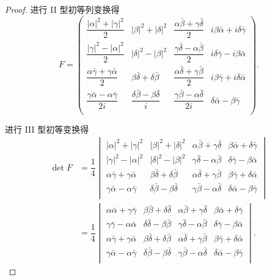 \documentclass[color=black,device=normal,lang=cn,mode=geye]{elegantnote}
\begin{document}
\begin{landscape}
\begin{proof}
        进行 II 型初等列变换得
        \[F=\begin{pmatrix}
            \dfrac{|\alpha|^2+|\gamma|^2}{2} & |\beta|^2+|\delta|^2 & \dfrac{\alpha\bar{\beta}+\gamma\bar{\delta}}{2} & i\beta\bar{\alpha}+i\delta\bar{\gamma} \\[8pt]
            \dfrac{|\gamma|^2-|\alpha|^2}{2} & |\delta|^2-|\beta|^2 & \dfrac{\gamma\bar{\delta}-\alpha\bar{\beta}}{2} & i\delta\bar{\gamma}-i\beta\bar{\alpha} \\[8pt]
            \dfrac{\alpha\bar{\gamma}+\gamma\bar{\alpha}}{2} & \beta\bar{\delta}+\delta\bar{\beta} & \dfrac{\alpha\bar{\delta}+\gamma\bar{\beta}}{2} & i\beta\bar{\gamma}+i\delta\bar{\alpha} \\[8pt]
            \dfrac{\gamma\bar{\alpha}-\alpha\bar{\gamma}}{2i} & \dfrac{\delta\bar{\beta}-\beta\bar{\delta}}{i} & \dfrac{\gamma\bar{\beta}-\alpha\bar{\delta}}{2i} & \delta\bar{\alpha}-\beta\bar{\gamma} \\[8pt]
        \end{pmatrix}.\]
    
        进行 III 型初等变换得
        \begin{align*}
            \det F & =\dfrac{1}{4}\begin{vmatrix}
                |\alpha|^2+|\gamma|^2 & |\beta|^2+|\delta|^2 & \alpha\bar{\beta}+\gamma\bar{\delta} & \beta\bar{\alpha}+\delta\bar{\gamma} \\
                |\gamma|^2-|\alpha|^2 & |\delta|^2-|\beta|^2 & \gamma\bar{\delta}-\alpha\bar{\beta} & \delta\bar{\gamma}-\beta\bar{\alpha} \\
                \alpha\bar{\gamma}+\gamma\bar{\alpha} & \beta\bar{\delta}+\delta\bar{\beta} & \alpha\bar{\delta}+\gamma\bar{\beta} & \beta\bar{\gamma}+\delta\bar{\alpha} \\
                \gamma\bar{\alpha}-\alpha\bar{\gamma} & \delta\bar{\beta}-\beta\bar{\delta} & \gamma\bar{\beta}-\alpha\bar{\delta} & \delta\bar{\alpha}-\beta\bar{\gamma} \\
            \end{vmatrix} \\
            & =\dfrac{1}{4}\begin{vmatrix}
                \alpha\bar{\alpha}+\gamma\bar{\gamma} & \beta\bar{\beta}+\delta\bar{\delta} & \alpha\bar{\beta}+\gamma\bar{\delta} & \beta\bar{\alpha}+\delta\bar{\gamma} \\
                \gamma\bar{\gamma}-\alpha\bar{\alpha} & \delta\bar{\delta}-\beta\bar{\beta} & \gamma\bar{\delta}-\alpha\bar{\beta} & \delta\bar{\gamma}-\beta\bar{\alpha} \\
                \alpha\bar{\gamma}+\gamma\bar{\alpha} & \beta\bar{\delta}+\delta\bar{\beta} & \alpha\bar{\delta}+\gamma\bar{\beta} & \beta\bar{\gamma}+\delta\bar{\alpha} \\
                \gamma\bar{\alpha}-\alpha\bar{\gamma} & \delta\bar{\beta}-\beta\bar{\delta} & \gamma\bar{\beta}-\alpha\bar{\delta} & \delta\bar{\alpha}-\beta\bar{\gamma} \\
            \end{vmatrix}.
        \end{align*}
    

\end{proof}
\end{landscape}
\end{document}
